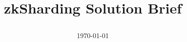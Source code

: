 \setlength{\droptitle}{-4\baselineskip} %

\pretitle{
    \begin{center}
    \end{center}
} %
\title{
    \begin{center}
        \Huge\bfseries {zkSharding Solution Brief}
    \end{center}
} %
\posttitle{
    \begin{center}
    \end{center}
} %
\date{\today} %

